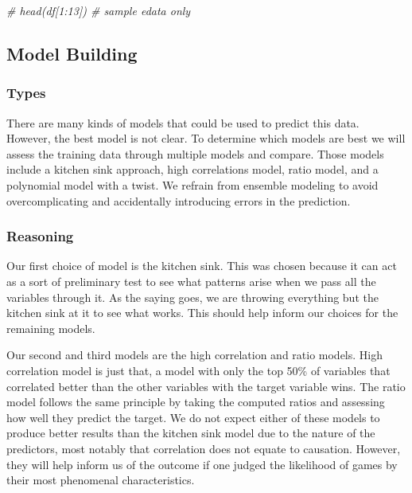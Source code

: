\documentclass[
]{article}
\newenvironment{Shaded}{\begin{snugshade}}{\end{snugshade}}
\newcommand{\CommentTok}[1]{\textcolor[rgb]{0.56,0.35,0.01}{\textit{#1}}}
\begin{document}
\begin{Shaded}
\begin{Highlighting}[]
\CommentTok{\# head(df[1:13]) \# sample edata only}
\end{Highlighting}
\end{Shaded}

\hypertarget{model-building}{%
\subsection{Model Building}\label{model-building}}

\hypertarget{types}{%
\subsubsection{Types}\label{types}}

There are many kinds of models that could be used to predict this data.
However, the best model is not clear. To determine which models are best
we will assess the training data through multiple models and compare.
Those models include a kitchen sink approach, high correlations model,
ratio model, and a polynomial model with a twist. We refrain from
ensemble modeling to avoid overcomplicating and accidentally introducing
errors in the prediction.

\hypertarget{reasoning}{%
\subsubsection{Reasoning}\label{reasoning}}

Our first choice of model is the kitchen sink. This was chosen because
it can act as a sort of preliminary test to see what patterns arise when
we pass all the variables through it. As the saying goes, we are
throwing everything but the kitchen sink at it to see what works. This
should help inform our choices for the remaining models.

Our second and third models are the high correlation and ratio models.
High correlation model is just that, a model with only the top 50\% of
variables that correlated better than the other variables with the
target variable wins. The ratio model follows the same principle by
taking the computed ratios and assessing how well they predict the
target. We do not expect either of these models to produce better
results than the kitchen sink model due to the nature of the predictors,
most notably that correlation does not equate to causation. However,
they will help inform us of the outcome if one judged the likelihood of
games by their most phenomenal characteristics.
\end{document}
